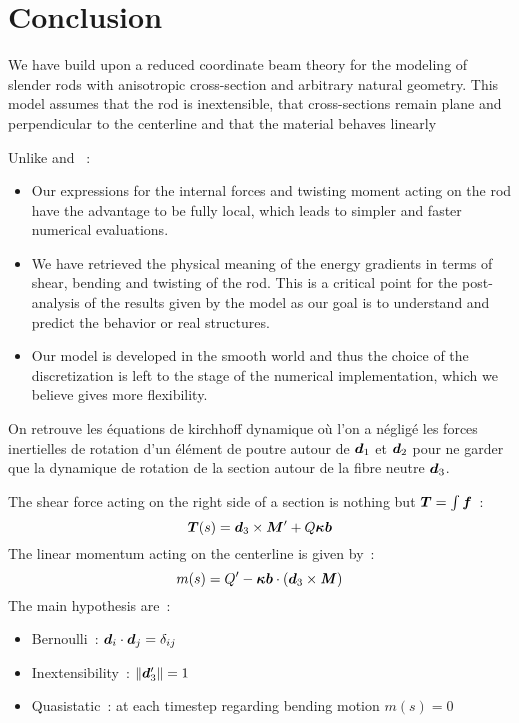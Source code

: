 \section{Conclusion}
We have build upon  a reduced coordinate beam theory for the modeling of slender rods with anisotropic cross-section and arbitrary natural geometry. This model assumes that the rod is inextensible, that cross-sections remain plane and perpendicular to the centerline and that the material behaves linearly


Unlike  and ~:
\begin{itemize}
\item Our expressions for the internal forces and twisting moment acting on the rod have the advantage to be fully local, which leads to simpler and faster numerical evaluations.
\item We have retrieved the physical meaning of the energy gradients in terms of shear, bending and twisting of the rod. This is a critical point for the post-analysis of the results given by the model as our goal is to understand and predict the behavior or real structures.
\item Our model is developed in the smooth world and thus the choice of the discretization is left to the stage of the numerical implementation, which we believe gives more flexibility.
\end{itemize}

On retrouve les équations de kirchhoff dynamique où l'on a négligé les forces inertielles de rotation d'un élément de poutre autour de $\boldsymbol{d}_1$ et $\boldsymbol{d}_2$ pour ne garder que la dynamique de rotation de la section autour de la fibre neutre $\boldsymbol{d}_3$.

The shear force acting on the right side of a section is nothing but $\boldsymbol{T} = \int \boldsymbol{f}$~:
\begin{equation}
	\boldsymbol{T}(s) = \boldsymbol{d}_3 \times \boldsymbol{M}'
		+ Q \boldsymbol{\kappa b}
\end{equation}
The linear momentum acting on the centerline is given by~:
\begin{equation}
	m(s) = Q' - \boldsymbol{\kappa b} \cdot (\boldsymbol{d}_3 \times \boldsymbol{\mathit{M}})
\end{equation}
 The main hypothesis are~:
\begin{itemize}
\item Bernoulli~: $\boldsymbol{d}_i \cdot \boldsymbol{d}_j = \delta_{ij}$
\item Inextensibility~: $\|\boldsymbol{d}'_3\| = 1$
\item Quasistatic~: at each timestep regarding bending motion $m(s) = 0$
\end{itemize}

